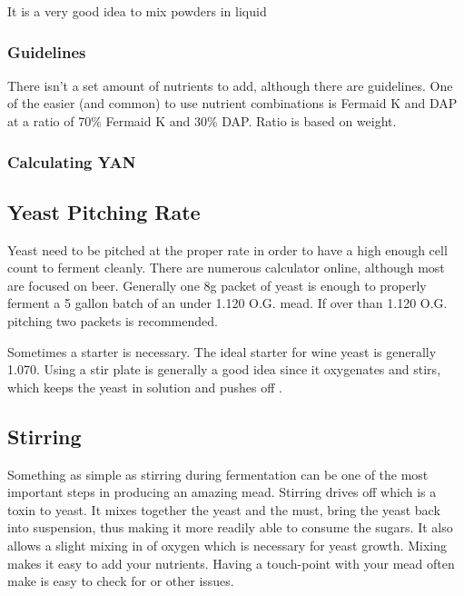 \documentclass{article}
\begin{document}
  It is a very good idea to mix powders in liquid
  \subsubsection{Guidelines}
   There isn't a set amount of nutrients to add, although there are guidelines. One of the easier (and common) to use nutrient 
   combinations is Fermaid K and DAP at a ratio of 70\% Fermaid K and 30\% DAP. Ratio is based on weight. 

  \subsubsection{Calculating YAN}

 \subsection{Yeast Pitching Rate}
  Yeast need to be pitched at the proper rate in order to have a high enough cell count to ferment cleanly. There are numerous calculator online, although most
  are focused on beer. Generally one 8g packet of yeast is enough to properly ferment a 5 gallon batch of an under 1.120 O.G. mead. If over than 1.120 O.G. pitching
  two packets is recommended. 

  Sometimes a starter is necessary. The ideal starter for wine yeast is generally 1.070. Using a stir plate is generally a good idea since it oxygenates and stirs,
  which keeps the yeast in solution and pushes off .

 \subsection{Stirring}
  Something as simple as stirring during fermentation can be one of the most important steps in producing an amazing mead. Stirring drives off  which is a 
  toxin to yeast. It mixes together the yeast and the must, bring the yeast back into suspension, thus making it more readily able to consume the sugars. It also
  allows a slight mixing in of oxygen which is necessary for yeast growth. Mixing makes it easy to add your nutrients. Having a touch-point with your mead often
  make is easy to check for  or other issues.
\end{document}

